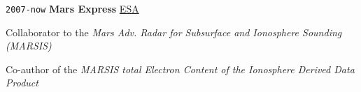 \noindent \texttt{2007-now} \tab \textbf{Mars Express} \tab
\href{https://www.esa.int/Science_Exploration/Space_Science/Mars_Express}{ESA}
\begin{adjustwidth}{2.5em}{}
Collaborator to the \textit{Mars Adv. Radar for Subsurface and Ionosphere Sounding (MARSIS)}
\end{adjustwidth}
\begin{adjustwidth}{2.5em}{}
Co-author of the \textit{MARSIS total Electron Content of the Ionosphere Derived Data Product}
\end{adjustwidth}
\vspace{.5em}


    
    
    
    
    
    
    
    
